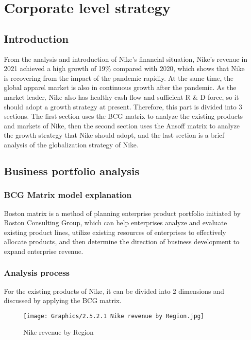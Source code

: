\documentclass[a4paper, 12pt]{report}
\begin{document}
\section{Corporate level strategy}

\subsection{Introduction}
From the analysis and introduction of Nike's financial situation, Nike's revenue in 2021 achieved a high growth of 19\% compared with 2020, which shows that Nike is recovering from the impact of the pandemic rapidly. At the same time, the global apparel market is also in continuous growth after the pandemic. As the market leader, Nike also has healthy cash flow and sufficient R \& D force, so it should adopt a growth strategy at present. Therefore, this part is divided into 3 sections. The first section uses the BCG matrix to analyze the existing products and markets of Nike, then the second section uses the Ansoff matrix to analyze the growth strategy that Nike should adopt, and the last section is a brief analysis of the globalization strategy of Nike.
\subsection{Business portfolio analysis}

\subsubsection{BCG Matrix model explanation}
Boston matrix is a method of planning enterprise product portfolio initiated by Boston Consulting Group, which can help enterprises analyze and evaluate existing product lines, utilize existing resources of enterprises to effectively allocate products, and then determine the direction of business development to expand enterprise revenue.
\subsubsection{Analysis process}
For the existing products of Nike, it can be divided into 2 dimensions and discussed by applying the BCG matrix.
 \begin{figure}[ht]
 			\begin{center}
				\texttt{[image: Graphics/2.5.2.1 Nike revenue by Region.jpg]}
			\end{center}
       		\caption{\label{2.5.2.1.1}Nike revenue by Region}
 \end{figure}
\end{document}
